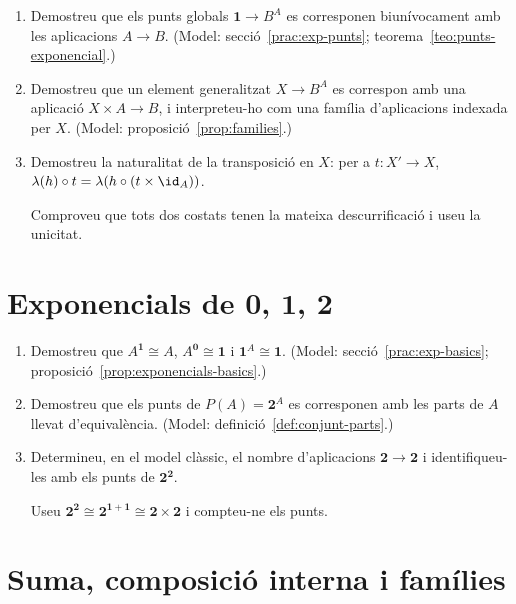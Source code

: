 \begin{enumerate}[resume]
  \item Demostreu que els punts globals \(\mathbf1\to B^A\) es corresponen biunívocament amb les aplicacions \(A\to B\). (Model: secció~\ref{prac:exp-punts}; teorema~\ref{teo:punts-exponencial}.)

  \item Demostreu que un element generalitzat \(X\to B^A\) es correspon amb una aplicació \(X\times A\to B\), i interpreteu-ho com una família d'aplicacions indexada per \(X\). (Model: proposició~\ref{prop:families}.)

  \item Demostreu la naturalitat de la transposició en \(X\): per a \(t\colon X'\to X\), \(\lambda(h)\circ t=\lambda(h\circ(t\times\id_A))\). \begin{indicacio}Comproveu que tots dos costats tenen la mateixa descurrificació i useu la unicitat.\end{indicacio}
\end{enumerate}

\section{Exponencials de \texorpdfstring{\(\mathbf0\), \(\mathbf1\), \(\mathbf2\)}{0, 1, 2}}

\begin{enumerate}[resume]
  \item Demostreu que \(A^{\mathbf1}\cong A\), \(A^{\mathbf0}\cong\mathbf1\) i \(\mathbf1^{A}\cong\mathbf1\). (Model: secció~\ref{prac:exp-basics}; proposició~\ref{prop:exponencials-basics}.)

  \item Demostreu que els punts de \(P(A)=\mathbf2^{A}\) es corresponen amb les parts de \(A\) llevat d'equivalència. (Model: definició~\ref{def:conjunt-parts}.)

  \item Determineu, en el model clàssic, el nombre d'aplicacions \(\mathbf2\to\mathbf2\) i identifiqueu-les amb els punts de \(\mathbf2^{\mathbf2}\). \begin{indicacio}Useu \(\mathbf2^{\mathbf2}\cong\mathbf2^{\mathbf1+\mathbf1}\cong\mathbf2\times\mathbf2\) i compteu-ne els punts.\end{indicacio}
\end{enumerate}

\section{Suma, composició interna i famílies}

